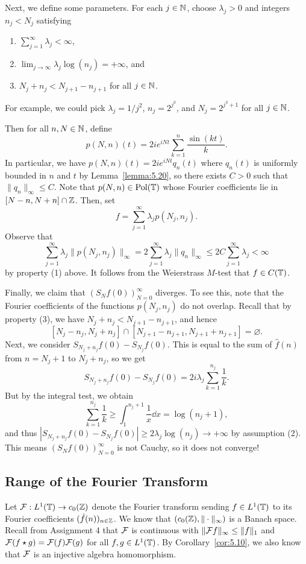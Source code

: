 Next, we define some parameters. For each $j \in \mathbb{N}$, choose 
$\lambda_j > 0$ and integers $n_j < N_j$ satisfying 
\begin{enumerate}[(1)]
    \item $\sum_{j=1}^\infty \lambda_j < \infty$, 
    \item $\lim_{j\to\infty} \lambda_j \log(n_j) = +\infty$, and 
    \item $N_j + n_j < N_{j+1} - n_{j+1}$ for all $j \in \mathbb{N}$. 
\end{enumerate}
For example, we could pick $\lambda_j = 1/j^2$, $n_j = 2^{j^3}$, and 
$N_j = 2^{j^3+1}$ for all $j \in \mathbb{N}$. 

Then for all $n, N \in \mathbb{N}$, define 
\[ p(N, n)(t) = 2ie^{iNt} \sum_{k=1}^n \frac{\sin(kt)}{k}. \] 
In particular, we have $p(N, n)(t) = 2ie^{iNt} q_n(t)$ where $q_n(t)$ is 
uniformly bounded in $n$ and $t$ by Lemma~\ref{lemma:5.20}, so 
there exists $C > 0$ such that $\|q_n\|_\infty \leq C$. Note that 
$p(N, n) \in \operatorname{Pol}(\mathbb{T})$ whose Fourier coefficients lie in 
$[N - n, N + n] \cap \mathbb{Z}$. Then, set 
\[ f = \sum_{j=1}^\infty \lambda_j p(N_j, n_j). \] 
Observe that 
\[ \sum_{j=1}^\infty \lambda_j \|p(N_j, n_j)\|_\infty 
= 2 \sum_{j=1}^\infty \lambda_j \|q_n\|_\infty \leq 
2C \sum_{j=1}^\infty \lambda_j < \infty \] 
by property (1) above. It follows from the Weierstrass $M$-test that 
$f \in C(\mathbb{T})$. 

Finally, we claim that $(S_N f(0))_{N=0}^\infty$ diverges. To see 
this, note that the Fourier coefficients of the functions $p(N_j, n_j)$ 
do not overlap. Recall that by property (3), we have $N_j + n_j < 
N_{j+1} - n_{j+1}$, and hence 
\[ [N_j - n_j, N_j + n_j] \cap [N_{j+1} - n_{j+1}, N_{j+1} + n_{j+1}] = 
\varnothing. \] 
Next, we consider $S_{N_j+n_j} f(0) - S_{N_j} f(0)$. This is equal 
to the sum of $\hat f(n)$ from $n = N_j+1$ to $N_j + n_j$, so we get 
\[ S_{N_j+n_j} f(0) - S_{N_j} f(0) = 2i \lambda_j \sum_{k=1}^{n_j} \frac1k. \] 
But by the integral test, we obtain 
\[ \sum_{k=1}^{n_j} \frac1k \geq \int_1^{n_j+1} \frac1x\dd x = 
\log(n_j+1), \]
and thus $|S_{N_j+n_j} f(0) - S_{N_j} f(0)| \geq 2\lambda_j \log(n_j) 
\to +\infty$ by assumption (2). This means $(S_N f(0))_{N=0}^\infty$ 
is not Cauchy, so it does not converge! 

\subsection{Range of the Fourier Transform} \label{subsec:5.5} 
Let ${\cal F} : L^1(\mathbb{T}) \to c_0(\mathbb{Z})$ denote the Fourier transform 
sending $f \in L^1(\mathbb{T})$ to its Fourier coefficients $(\hat f(n))_{n\in\mathbb{Z}}$. 
We know that $(c_0(\mathbb{Z}), \|\cdot\|_\infty)$ is a Banach space.
Recall from Assignment 4 that ${\cal F}$ is continuous with 
$\|{\cal F}f\|_\infty \leq \|f\|_1$ and ${\cal F}(f \star g) = 
{\cal F}(f) {\cal F}(g)$ for all $f, g \in L^1(\mathbb{T})$. By Corollary~\ref{cor:5.10},
we also know that ${\cal F}$ is an injective algebra homomorphism.

